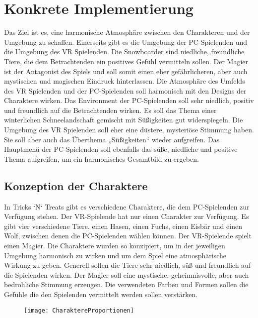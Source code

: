 \chapter{Konkrete Implementierung}
Das Ziel ist es, eine harmonische Atmosphäre zwischen den Charakteren und der Umgebung zu schaffen. Einerseits gibt es die Umgebung der PC-Spielenden und die Umgebung des VR Spielenden. Die Snowboarder sind niedliche, freundliche Tiere, die dem Betrachtenden ein positives Gefühl vermitteln sollen. Der Magier ist der Antagonist des Spiels und soll somit einen eher gefährlicheren, aber auch mystischen und magischen Eindruck hinterlassen. Die Atmosphäre des Umfelds des VR Spielenden und der PC-Spielenden soll harmonisch mit den Designs der Charaktere wirken. Das Environment der PC-Spielenden soll sehr niedlich, positiv und freundlich auf die Betrachtenden wirken. Es soll das Thema einer winterlichen Schneelandschaft gemischt mit Süßigkeiten gut widerspiegeln. Die Umgebung des VR Spielenden soll eher eine düstere, mysteriöse Stimmung haben. Sie soll aber auch das Überthema „Süßigkeiten“ wieder aufgreifen. Das Hauptmenü der PC-Spielenden soll ebenfalls das süße, niedliche und positive Thema aufgreifen, um ein harmonisches Gesamtbild zu ergeben.

\section{Konzeption der Charaktere}
In Tricks `N` Treats gibt es verschiedene Charaktere, die dem PC-Spielenden zur Verfügung stehen. Der VR-Spielende hat nur einen Charakter zur Verfügung. Es gibt vier verschiedene Tiere, einen Hasen, einen Fuchs, einen Eisbär und einen Wolf, zwischen denen die PC-Spielenden wählen können. Der VR-Spielende spielt einen Magier. Die Charaktere wurden so konzipiert, um in der jeweiligen Umgebung harmonisch zu wirken und um dem Spiel eine atmosphärische Wirkung zu geben. Generell sollen die Tiere sehr niedlich, süß und freundlich auf die Spielenden wirken. Der Magier soll eine mystische, geheimnisvolle, aber auch bedrohliche Stimmung erzeugen. Die verwendeten Farben und Formen sollen die Gefühle die den Spielenden vermittelt werden sollen verstärken.
 
 \begin{figure}[H]
 	\centering
 	\texttt{[image: CharaktereProportionen]}
 \end{figure}

